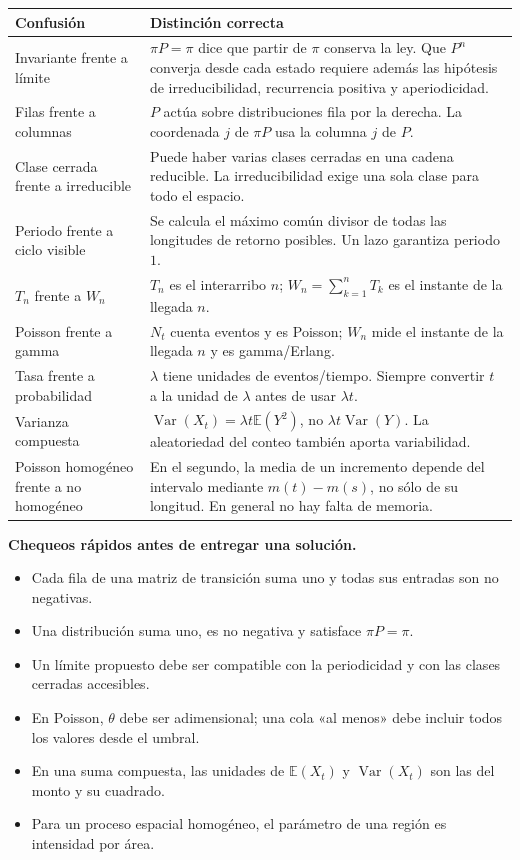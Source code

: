 \documentclass[11pt,oneside]{article}
\newcommand{\E}{\mathbb{E}}
\newcommand{\Var}{\operatorname{Var}}
\newcommand{\1}{\mathbf{1}}
\begin{document}
\begin{tabularx}{\textwidth}{>{\raggedright\arraybackslash}p{}X}
\toprule
\textbf{Confusión} & \textbf{Distinción correcta}\\
\midrule
Invariante frente a límite & $\pi P=\pi$ dice que partir de $\pi$ conserva la ley. Que $P^n$ converja desde cada estado requiere además las hipótesis de irreducibilidad, recurrencia positiva y aperiodicidad.\\
Filas frente a columnas & $P$ actúa sobre distribuciones fila por la derecha. La coordenada $j$ de $\pi P$ usa la columna $j$ de $P$.\\
Clase cerrada frente a irreducible & Puede haber varias clases cerradas en una cadena reducible. La irreducibilidad exige una sola clase para todo el espacio.\\
Periodo frente a ciclo visible & Se calcula el máximo común divisor de todas las longitudes de retorno posibles. Un lazo garantiza periodo $1$.\\
$T_n$ frente a $W_n$ & $T_n$ es el interarribo $n$; $W_n=\sum_{k=1}^nT_k$ es el instante de la llegada $n$.\\
Poisson frente a gamma & $N_t$ cuenta eventos y es Poisson; $W_n$ mide el instante de la llegada $n$ y es gamma/Erlang.\\
Tasa frente a probabilidad & $\lambda$ tiene unidades de eventos/tiempo. Siempre convertir $t$ a la unidad de $\lambda$ antes de usar $\lambda t$.\\
Varianza compuesta & $\Var(X_t)=\lambda t\E(Y^2)$, no $\lambda t\Var(Y)$. La aleatoriedad del conteo también aporta variabilidad.\\
Poisson homogéneo frente a no homogéneo & En el segundo, la media de un incremento depende del intervalo mediante $m(t)-m(s)$, no sólo de su longitud. En general no hay falta de memoria.\\
\bottomrule
\end{tabularx}

\textbf{Chequeos rápidos antes de entregar una solución.}
\begin{itemize}
  \item Cada fila de una matriz de transición suma uno y todas sus entradas son no negativas.
  \item Una distribución suma uno, es no negativa y satisface $\pi P=\pi$.
  \item Un límite propuesto debe ser compatible con la periodicidad y con las clases cerradas accesibles.
  \item En Poisson, $\theta$ debe ser adimensional; una cola «al menos» debe incluir todos los valores desde el umbral.
  \item En una suma compuesta, las unidades de $\E(X_t)$ y $\Var(X_t)$ son las del monto y su cuadrado.
  \item Para un proceso espacial homogéneo, el parámetro de una región es intensidad por área.
\end{itemize}
\end{document}
